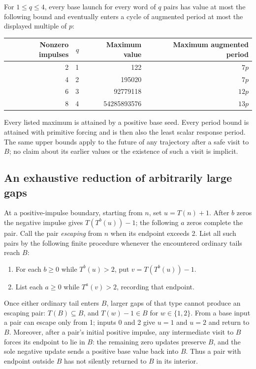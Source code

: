 \begin{theorem}\label{thm:impulse-bounds}
For $1\le q\le4$, every base launch for every word of $q$ pairs has value
at most the following bound and eventually enters a cycle of augmented
period at most the displayed multiple of $p$:
\begin{center}
\begin{tabular}{rrrr}\toprule
Nonzero impulses & $q$ & Maximum value & Maximum augmented period\\\midrule
2&1&122&$7p$\\
4&2&195020&$7p$\\
6&3&92779118&$12p$\\
8&4&54285893576&$13p$\\\bottomrule
\end{tabular}
\end{center}
Every listed maximum is attained by a positive base seed. Every period
bound is attained with primitive forcing and is then also the least
scalar response period. The same upper bounds apply to the future of
any trajectory after a safe visit to $B$; no claim about its earlier
values or the existence of such a visit is implicit.
\end{theorem}

\subsection{An exhaustive reduction of arbitrarily large gaps}

At a positive-impulse boundary, starting from $n$, set $u=T(n)+1$.
After $b$ zeros the negative impulse gives $T(T^b(u))-1$; the following
$a$ zeros complete the pair. Call the pair \emph{escaping} from $n$
when its endpoint exceeds 2. List all such pairs by the following finite
procedure whenever the encountered ordinary tails reach $B$:
\begin{enumerate}
\item For each $b\ge0$ while $T^b(u)>2$, put $v=T(T^b(u))-1$.
\item List each $a\ge0$ while $T^a(v)>2$, recording that endpoint.
\end{enumerate}
Once either ordinary tail enters $B$, larger gaps of that type cannot
produce an escaping pair: $T(B)\subseteq B$, and $T(w)-1\in B$ for
$w\in\{1,2\}$. From a base input a pair can escape only from 1;
inputs 0 and 2 give $u=1$ and $u=2$ and return to $B$.
Moreover, after a pair's initial positive impulse, any intermediate
visit to $B$ forces its endpoint to lie in $B$: the remaining zero
updates preserve $B$, and the sole negative update sends a positive
base value back into $B$. Thus a pair with endpoint outside $B$ has
not silently returned to $B$ in its interior.

